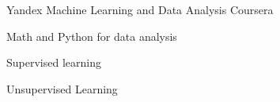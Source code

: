 \begin{cventries}
  \cventry
    {Yandex Machine Learning and Data Analysis}
    {Coursera}
    {}
    {}
    {
      \begin{cvitems}
        \item {Math and Python for data analysis}
        \item {Supervised learning}
        \item {Unsupervised Learning}
      \end{cvitems}
    }
\end{cventries}
